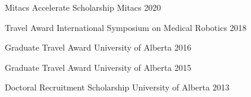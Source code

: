 

\begin{cvawards}
  
  \cvaward
    {Mitacs Accelerate Scholarship}
    {Mitacs}
    {2020}

  \cvaward
    {Travel Award} %
    {International Symposium on Medical Robotics} %
    {2018} %

  \cvaward
    {Graduate Travel Award} %
    {University of Alberta} %
    {2016} %

  \cvaward
    {Graduate Travel Award} %
    {University of Alberta} %
    {2015} %

  \cvaward
    {Doctoral Recruitment Scholarship} %
    {University of Alberta} %
    {2013} %

\end{cvawards}
